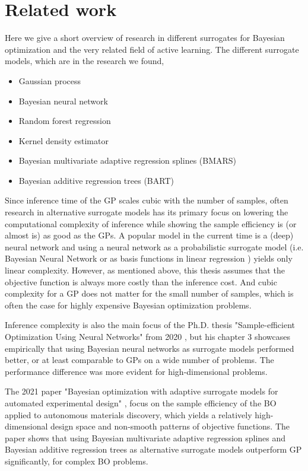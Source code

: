 \section{Related work}
Here we give a short overview of research in different surrogates for Bayesian optimization
and the very related field of active learning. The different surrogate models, which are in the 
research we found, 
\begin{itemize}[noitemsep]
    \item Gaussian process
    \item Bayesian neural network
    \item Random forest regression
    \item Kernel density estimator
    \item Bayesian multivariate adaptive regression splines (BMARS)
    \item Bayesian additive regression trees (BART)
\end{itemize}

Since inference time of the GP scales cubic with the number of samples, often research in
alternative surrogate models has its primary focus on lowering the computational complexity of
inference while showing the sample efficiency is (or almost is) as good as the GPs. A popular model
in the current time is a (deep) neural network and using a neural network as a probabilistic
surrogate model (i.e. Bayesian Neural Network \cite{BOHAMIANN} or as basis functions in linear
regression \cite{DNGO}) yields only linear complexity. However, as mentioned above, this thesis
assumes that the objective function is always more costly than the inference cost. And cubic
complexity for a GP does not matter for the small number of samples, which is often the case for
highly expensive Bayesian optimization problems. 

Inference complexity is also the main focus of the Ph.D. thesis "Sample-efficient Optimization Using
Neural Networks" from 2020 \cite{PhDthesis}, but his chapter 3 showcases empirically that using Bayesian
neural networks as surrogate models performed better, or at least comparable to GPs on a wide number
of problems. The performance difference was more evident for high-dimensional problems.

The 2021 paper "Bayesian optimization with adaptive surrogate models for automated experimental design"
\cite{Nature_BO_paper}, focus on the sample efficiency of the BO applied to autonomous materials discovery, 
which yields a relatively high-dimensional design space and non-smooth patterns of objective functions.  
The paper shows that using Bayesian multivariate adaptive regression splines
and Bayesian additive regression trees as alternative surrogate models outperform GP significantly, 
for complex BO problems. 

